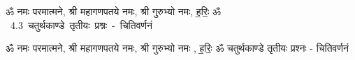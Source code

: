 \documentclass[17pt]{extarticle}
\begin{document}
\begin{titlepage}
    \begin{center}
 
\begin{sanskrit}
    { \Large
    ॐ नमः परमात्मने, श्री महागणपतये नमः, 
श्री गुरुभ्यो नमः, ह॒रिः॒ ॐ 
    }
    \\
    \vspace{2.5cm}
    \mbox{ \Huge
    4.3      चतुर्थकाण्डे तृतीयः प्रश्नः - चितिवर्णनं   }
\end{sanskrit}
\end{center}

\end{titlepage}
\tableofcontents

ॐ नमः परमात्मने, श्री महागणपतये नमः, 
श्री गुरुभ्यो नमः , ह॒रिः॒ ॐ       चतुर्थकाण्डे तृतीयः प्रश्नः - चितिवर्णनं \newline

\end{document}
